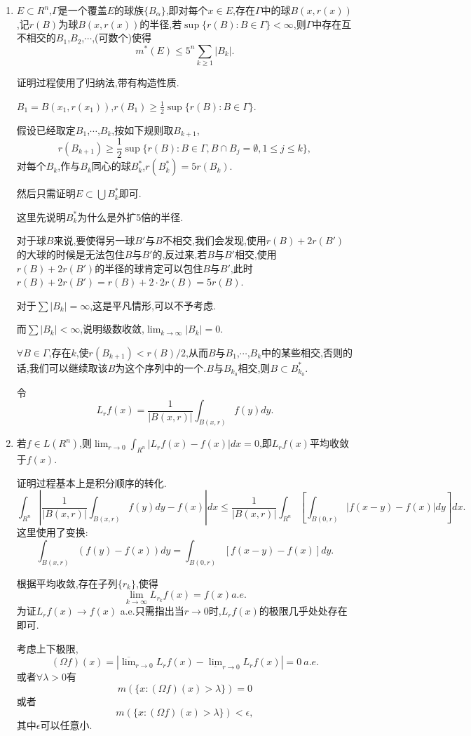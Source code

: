 \documentclass[12pt,a4paper,openany]{book}
\begin{document}
\begin{enumerate}
\item $E \subset R^n$,$\Gamma$是一个覆盖$E$的球族$\{B_{\alpha}\}$,即对每个$x \in E$,存在$\Gamma$中的球$B(x,r(x))$,记$r(B)$为球$B(x,r(x))$的半径,若$\sup{\{r(B):B\in \Gamma\}} < \infty$,则$\Gamma$中存在互不相交的$B_1$,$B_2$,$\cdots$,(可数个)使得
\[
m^*(E) \le 5^{n}\sum_{k \ge 1}{|B_k|}.
\]

证明过程使用了归纳法,带有构造性质.

$B_1 = B(x_1,r(x_1))$,$r(B_1) \ge \frac{1}{2}\sup{\{r(B):B \in \Gamma\}}$.

假设已经取定$B_1$,$\cdots$,$B_k$,按如下规则取$B_{k+1}$,
\[
r(B_{k+1}) \ge \frac{1}{2}\sup\{r(B): B \in \Gamma, B \cap B_j=\emptyset, 1 \le j \le k\},
\]
对每个$B_k$,作与$B_k$同心的球$B_k^*$,$r(B_k^*)=5r(B_k)$.

然后只需证明$E \subset \bigcup{B_k^*}$即可.

这里先说明$B_k^*$为什么是外扩5倍的半径.

对于球$B$来说,要使得另一球$B'$与$B$不相交,我们会发现,使用$r(B)+2r(B')$的大球的时候是无法包住$B$与$B'$的,反过来,若$B$与$B'$相交,使用$r(B)+2r(B')$的半径的球肯定可以包住$B$与$B'$,此时$r(B)+2r(B')=r(B)+2\cdot2r(B)=5r(B)$.

对于$\sum|B_k|=\infty$,这是平凡情形,可以不予考虑.

而$\sum{|B_k|}<\infty$,说明级数收敛,$\lim_{k\rightarrow \infty}{|B_k|}=0$.

$\forall B \in \Gamma$,存在$k$,使$r(B_{k+1})<r(B)/2$,从而$B$与$B_1$,$\cdots$,$B_k$中的某些相交,否则的话,我们可以继续取该$B$为这个序列中的一个.$B$与$B_{k_0}$相交,则$B \subset B_{k_0}^*$.

令
\[
L_rf(x)=\frac{1}{|B(x,r)|}\int_{B(x,r)}{f(y)dy}.
\]

\item 若$f \in L(R^n)$,则$\lim_{r \rightarrow 0}{\int_{R^n}{|L_rf(x)-f(x)|dx}}=0$,即$L_rf(x)$平均收敛于$f(x)$.

证明过程基本上是积分顺序的转化.
\[
\int_{R^n}{|\frac{1}{|B(x,r)|}\int_{B(x,r)}{f(y)dy} - f(x)|dx} \le \frac{1}{|B(x,r)|}\int_{R^n}{[\int_{B(0,r)}{|f(x-y)-f(x)|dy}]dx}.
\]
这里使用了变换:
\[
\int_{B(x,r)}{(f(y)-f(x))dy} = \int_{B(0,r)}{[f(x-y)-f(x)]dy}.
\]

根据平均收敛,存在子列$\{r_k\}$,使得
\[
\lim_{k \rightarrow \infty}{L_{r_k}f(x)} = f(x) a.e.
\]
为证$L_rf(x) \rightarrow f(x)$ a.e.只需指出当$r \rightarrow 0$时,$L_rf(x)$的极限几乎处处存在即可.

考虑上下极限,
\[
(\Omega{f})(x)=|\overline{\lim}_{r \rightarrow 0}{L_rf(x)} - \underline{\lim}_{r \rightarrow 0}{L_rf(x)}|=0\ a.e.
\]
或者$\forall \lambda>0$有
\[
m(\{x: (\Omega{f})(x) > \lambda\})=0
\]
或者
\[
m(\{x: (\Omega{f})(x)>\lambda\})<\epsilon,
\]
其中$\epsilon$可以任意小.


\end{enumerate}
\end{document}
